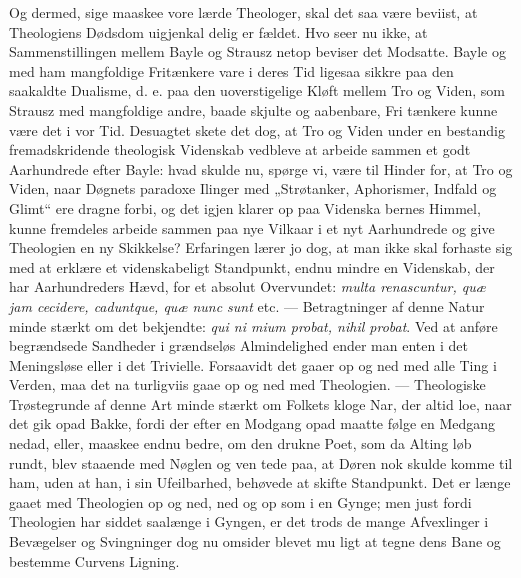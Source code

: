 \documentclass[12pt]{book}
\newcommand{\opage}[1]{\marginnote{\footnotesize\textit{[#1]}}}
\begin{document}
Og dermed, sige maaskee vore lærde Theologer, skal
det saa være beviist, at Theologiens Dødsdom uigjenkal\-%
delig er fældet. Hvo seer nu ikke, at Sammenstillingen
mellem Bayle og Strausz netop beviser det Modsatte.
Bayle og med ham mangfoldige Fritænkere vare i deres
Tid ligesaa sikkre paa den saakaldte Dualisme, d. e. paa
den uoverstigelige Kløft mellem Tro og Viden, som Strausz
med mangfoldige andre, baade skjulte og aabenbare, Fri\-%
tænkere kunne være det i vor Tid. Desuagtet skete det
dog, at Tro og Viden under en bestandig fremadskridende
theologisk Videnskab vedbleve at arbeide sammen et godt
Aarhundrede efter Bayle: hvad skulde nu, spørge vi, være
\opage{272}\setcounter{footnote}{0}%
til Hinder for, at Tro og Viden, naar Døgnets paradoxe
Ilinger med „Strøtanker, Aphorismer, Indfald og Glimt“
ere dragne forbi, og det igjen klarer op paa Videnska\-%
bernes Himmel, kunne fremdeles arbeide sammen paa nye
Vilkaar i et nyt Aarhundrede og give Theologien en ny
Skikkelse? Erfaringen lærer jo dog, at man ikke skal
forhaste sig med at erklære et videnskabeligt Standpunkt,
endnu mindre en Videnskab, der har Aarhundreders Hævd,
for et absolut Overvundet: \textit{multa renascuntur, quæ jam
cecidere, caduntque, quæ nunc sunt} etc. --- Betragtninger
af denne Natur minde stærkt om det bekjendte: \textit{qui ni\-%
mium probat, nihil probat}. Ved at anføre begrændsede
Sandheder i grændseløs Almindelighed ender man enten
i det Meningsløse eller i det Trivielle. Forsaavidt det
gaaer op og ned med alle Ting i Verden, maa det na\-%
turligviis gaae op og ned med Theologien. --- Theologiske
Trøstegrunde af denne Art minde stærkt om Folkets kloge
Nar, der altid loe, naar det gik opad Bakke, fordi der
efter en Modgang opad maatte følge en Medgang nedad,
eller, maaskee endnu bedre, om den drukne Poet, som
da Alting løb rundt, blev staaende med Nøglen og ven\-%
tede paa, at Døren nok skulde komme til ham, uden at
han, i sin Ufeilbarhed, behøvede at skifte Standpunkt.
Det er længe gaaet med Theologien op og ned, ned og
op som i en Gynge; men just fordi Theologien har siddet
saalænge i Gyngen, er det trods de mange Afvexlinger
i Bevægelser og Svingninger dog nu omsider blevet mu\-%
ligt at tegne dens Bane og bestemme Curvens Ligning.
\end{document}
